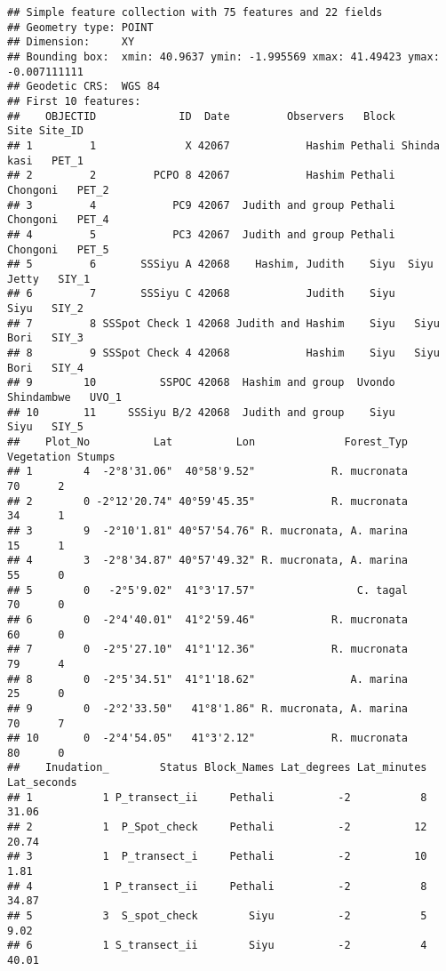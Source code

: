 \documentclass[
]{article}
\begin{document}
\begin{verbatim}
## Simple feature collection with 75 features and 22 fields
## Geometry type: POINT
## Dimension:     XY
## Bounding box:  xmin: 40.9637 ymin: -1.995569 xmax: 41.49423 ymax: -0.007111111
## Geodetic CRS:  WGS 84
## First 10 features:
##    OBJECTID             ID  Date         Observers   Block        Site Site_ID
## 1         1              X 42067            Hashim Pethali Shinda kasi   PET_1
## 2         2         PCPO 8 42067            Hashim Pethali    Chongoni   PET_2
## 3         4            PC9 42067  Judith and group Pethali    Chongoni   PET_4
## 4         5            PC3 42067  Judith and group Pethali    Chongoni   PET_5
## 5         6       SSSiyu A 42068    Hashim, Judith    Siyu  Siyu Jetty   SIY_1
## 6         7       SSSiyu C 42068            Judith    Siyu        Siyu   SIY_2
## 7         8 SSSpot Check 1 42068 Judith and Hashim    Siyu   Siyu Bori   SIY_3
## 8         9 SSSpot Check 4 42068            Hashim    Siyu   Siyu Bori   SIY_4
## 9        10          SSPOC 42068  Hashim and group  Uvondo  Shindambwe   UVO_1
## 10       11     SSSiyu B/2 42068  Judith and group    Siyu        Siyu   SIY_5
##    Plot_No          Lat          Lon              Forest_Typ Vegetation Stumps
## 1        4  -2°8'31.06"  40°58'9.52"            R. mucronata         70      2
## 2        0 -2°12'20.74" 40°59'45.35"            R. mucronata         34      1
## 3        9  -2°10'1.81" 40°57'54.76" R. mucronata, A. marina         15      1
## 4        3  -2°8'34.87" 40°57'49.32" R. mucronata, A. marina         55      0
## 5        0   -2°5'9.02"  41°3'17.57"                C. tagal         70      0
## 6        0  -2°4'40.01"  41°2'59.46"            R. mucronata         60      0
## 7        0  -2°5'27.10"  41°1'12.36"            R. mucronata         79      4
## 8        0  -2°5'34.51"  41°1'18.62"               A. marina         25      0
## 9        0  -2°2'33.50"   41°8'1.86" R. mucronata, A. marina         70      7
## 10       0  -2°4'54.05"   41°3'2.12"            R. mucronata         80      0
##    Inudation_        Status Block_Names Lat_degrees Lat_minutes Lat_seconds
## 1           1 P_transect_ii     Pethali          -2           8       31.06
## 2           1  P_Spot_check     Pethali          -2          12       20.74
## 3           1  P_transect_i     Pethali          -2          10        1.81
## 4           1 P_transect_ii     Pethali          -2           8       34.87
## 5           3  S_spot_check        Siyu          -2           5        9.02
## 6           1 S_transect_ii        Siyu          -2           4       40.01

\end{verbatim}
\end{document}
